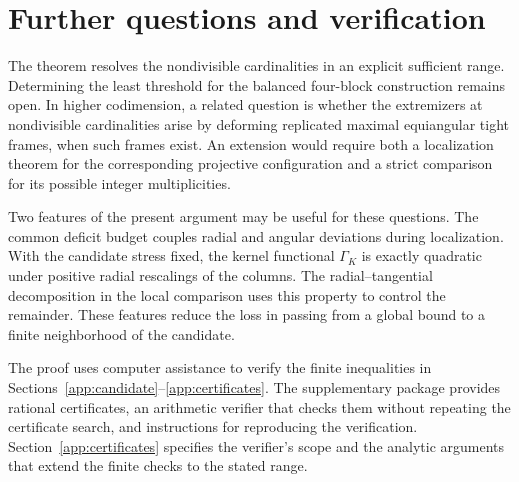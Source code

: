\section{Further questions and verification}
The theorem resolves the nondivisible cardinalities in an explicit
sufficient range. Determining the least threshold for the balanced
four-block construction remains open. In higher codimension, a related
question is whether the extremizers at nondivisible cardinalities arise
by deforming replicated maximal equiangular tight frames, when such
frames exist. An extension would require both a localization theorem
for the corresponding projective configuration and a strict comparison
for its possible integer multiplicities.

Two features of the present argument may be useful for these questions.
The common deficit budget couples radial and angular deviations during
localization. With the candidate stress fixed, the kernel functional
$\Gamma_K$ is exactly quadratic under positive radial rescalings of
the columns. The radial--tangential decomposition in the local
comparison uses this property to control the remainder. These features
reduce the loss in passing from a global bound to a finite neighborhood
of the candidate.

The proof uses computer assistance to verify the finite inequalities in
Sections~\ref{app:candidate}--\ref{app:certificates}. The supplementary
package provides rational certificates, an arithmetic verifier that checks
them without repeating the certificate search, and instructions for
reproducing the verification.
Section~\ref{app:certificates} specifies the verifier's scope and the
analytic arguments that extend the finite checks to the stated range.
